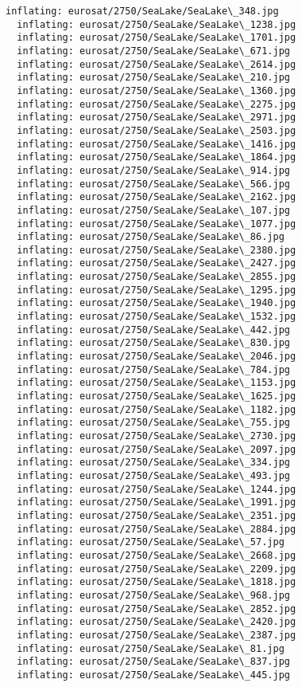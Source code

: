 \documentclass[11pt]{article}
\begin{document}
\begin{Verbatim}[commandchars=\\\{\}]
  inflating: eurosat/2750/SeaLake/SeaLake\_348.jpg
  inflating: eurosat/2750/SeaLake/SeaLake\_1238.jpg
  inflating: eurosat/2750/SeaLake/SeaLake\_1701.jpg
  inflating: eurosat/2750/SeaLake/SeaLake\_671.jpg
  inflating: eurosat/2750/SeaLake/SeaLake\_2614.jpg
  inflating: eurosat/2750/SeaLake/SeaLake\_210.jpg
  inflating: eurosat/2750/SeaLake/SeaLake\_1360.jpg
  inflating: eurosat/2750/SeaLake/SeaLake\_2275.jpg
  inflating: eurosat/2750/SeaLake/SeaLake\_2971.jpg
  inflating: eurosat/2750/SeaLake/SeaLake\_2503.jpg
  inflating: eurosat/2750/SeaLake/SeaLake\_1416.jpg
  inflating: eurosat/2750/SeaLake/SeaLake\_1864.jpg
  inflating: eurosat/2750/SeaLake/SeaLake\_914.jpg
  inflating: eurosat/2750/SeaLake/SeaLake\_566.jpg
  inflating: eurosat/2750/SeaLake/SeaLake\_2162.jpg
  inflating: eurosat/2750/SeaLake/SeaLake\_107.jpg
  inflating: eurosat/2750/SeaLake/SeaLake\_1077.jpg
  inflating: eurosat/2750/SeaLake/SeaLake\_86.jpg
  inflating: eurosat/2750/SeaLake/SeaLake\_2380.jpg
  inflating: eurosat/2750/SeaLake/SeaLake\_2427.jpg
  inflating: eurosat/2750/SeaLake/SeaLake\_2855.jpg
  inflating: eurosat/2750/SeaLake/SeaLake\_1295.jpg
  inflating: eurosat/2750/SeaLake/SeaLake\_1940.jpg
  inflating: eurosat/2750/SeaLake/SeaLake\_1532.jpg
  inflating: eurosat/2750/SeaLake/SeaLake\_442.jpg
  inflating: eurosat/2750/SeaLake/SeaLake\_830.jpg
  inflating: eurosat/2750/SeaLake/SeaLake\_2046.jpg
  inflating: eurosat/2750/SeaLake/SeaLake\_784.jpg
  inflating: eurosat/2750/SeaLake/SeaLake\_1153.jpg
  inflating: eurosat/2750/SeaLake/SeaLake\_1625.jpg
  inflating: eurosat/2750/SeaLake/SeaLake\_1182.jpg
  inflating: eurosat/2750/SeaLake/SeaLake\_755.jpg
  inflating: eurosat/2750/SeaLake/SeaLake\_2730.jpg
  inflating: eurosat/2750/SeaLake/SeaLake\_2097.jpg
  inflating: eurosat/2750/SeaLake/SeaLake\_334.jpg
  inflating: eurosat/2750/SeaLake/SeaLake\_493.jpg
  inflating: eurosat/2750/SeaLake/SeaLake\_1244.jpg
  inflating: eurosat/2750/SeaLake/SeaLake\_1991.jpg
  inflating: eurosat/2750/SeaLake/SeaLake\_2351.jpg
  inflating: eurosat/2750/SeaLake/SeaLake\_2884.jpg
  inflating: eurosat/2750/SeaLake/SeaLake\_57.jpg
  inflating: eurosat/2750/SeaLake/SeaLake\_2668.jpg
  inflating: eurosat/2750/SeaLake/SeaLake\_2209.jpg
  inflating: eurosat/2750/SeaLake/SeaLake\_1818.jpg
  inflating: eurosat/2750/SeaLake/SeaLake\_968.jpg
  inflating: eurosat/2750/SeaLake/SeaLake\_2852.jpg
  inflating: eurosat/2750/SeaLake/SeaLake\_2420.jpg
  inflating: eurosat/2750/SeaLake/SeaLake\_2387.jpg
  inflating: eurosat/2750/SeaLake/SeaLake\_81.jpg
  inflating: eurosat/2750/SeaLake/SeaLake\_837.jpg
  inflating: eurosat/2750/SeaLake/SeaLake\_445.jpg

\end{Verbatim}
\end{document}
